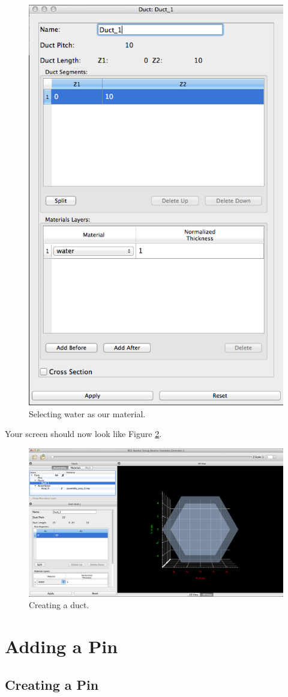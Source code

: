 \begin{figure}[H]
	\begin{center}
		\includegraphics[width=0.5\linewidth]{Images/hex-set-duct-material.png}
		\caption{Selecting water as our material.}
		\label{fig:Hex7}
	\end{center}
\end{figure}

Your screen should now look like Figure \ref{fig:Hex8}.

\begin{figure}[H]
	\begin{center}
		\includegraphics[width=0.5\linewidth]{Images/hex-duct-result.png}
		\caption{Creating a duct.}
		\label{fig:Hex8}
	\end{center}
\end{figure}

\section{Adding a Pin}
\subsection{Creating a Pin}

